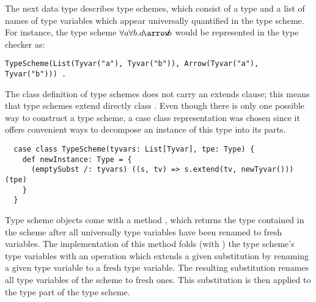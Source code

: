 {The next data type describes type schemes, which consist of a type and
a list of names of type variables which appear universally quantified
in the type scheme. 
For instance, the type scheme $\forall a\forall b.a \!\arrow\! b$ would be represented in the type checker as:
\begin{lstlisting}
TypeScheme(List(Tyvar("a"), Tyvar("b")), Arrow(Tyvar("a"), Tyvar("b"))) .
\end{lstlisting}
The class definition of type schemes does not carry an extends
clause; this means that type schemes extend directly class
.  Even though there is only one possible way to
construct a type scheme, a case class representation was chosen
since it offers convenient ways to decompose an instance of this type into its
parts.
\begin{lstlisting}
  case class TypeScheme(tyvars: List[Tyvar], tpe: Type) {
    def newInstance: Type = {
      (emptySubst /: tyvars) ((s, tv) => s.extend(tv, newTyvar())) (tpe)
    }
  }
\end{lstlisting}
Type scheme objects come with a method , which
returns the type contained in the scheme after all universally type
variables have been renamed to fresh variables. The implementation of
this method folds (with \code{/:}) the type scheme's type variables
with an operation which extends a given substitution  by
renaming a given type variable  to a fresh type
variable. The resulting substitution renames all type variables of the
scheme to fresh ones. This substitution is then applied to the type
part of the type scheme.

}
